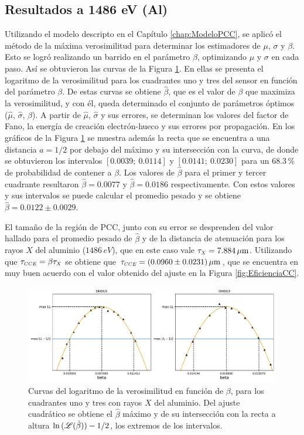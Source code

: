 \subsection{Resultados a 1486 eV (Al)}
\noindent Utilizando el modelo descripto en el Capítulo \ref{chap:ModeloPCC}, se aplicó el método de la máxima verosimilitud para determinar los estimadores de $\mu$, $\sigma$ y $\beta$. Esto se logró realizando un barrido en el parámetro $\beta$, optimizando $\mu$ y $\sigma$ en cada paso. Así se obtuvieron las curvas de la Figura \ref{fig:Al_barridos_beta}. En ellas se presenta el logaritmo de la verosimilitud para los cuadrantes uno y tres del sensor en función del parámetro $\beta$. De estas curvas se obtiene $\hat{\beta}$, que es el valor de $\beta$ que maximiza la verosimilitud, y con él, queda determinado el conjunto de parámetros óptimos ($\hat{\mu}$, $\hat{\sigma}$, $\hat{\beta}$). A partir de $\hat{\mu}$, $\hat{\sigma}$ y sus errores, se determinan los valores del factor de Fano, la energía de creación electrón-hueco y sus errores por propagación. En los gráficos de la Figura \ref{fig:Al_barridos_beta} se muestra además la recta que se encuentra a una distancia $a=1/2$ por debajo del máximo y su intersección con la curva, de donde se obtuvieron los intervalos $[0.0039;\ 0.0114]$ y $[0.0141;\ 0.0230]$ para un $68.3\,\%$ de probabilidad de contener a $\beta$. Los valores de $\hat{\beta}$ para el primer y tercer cuadrante resultaron $\hat{\beta} = 0.0077$ y $\hat{\beta}=0.0186$ respectivamente. Con estos valores y sus intervalos se puede calcular el promedio pesado y se obtiene $\hat{\beta} = 0.0122 \pm 0.0029 $.

El tamaño de la región de PCC, junto con su error se desprenden del valor hallado para el promedio pesado de $\hat{\beta}$ y de la distancia de atenuación para los rayos $X$ del aluminio ($1486\,\si{eV}$), que en este caso vale $\tau_{\scaleto{X}{4pt}}=7.884\,\si{\mu m}$\cite{AttenuationLength}. Utilizando que $\tau_{\scaleto{CCE}{4pt}} = \beta \tau_{\scaleto{X}{4pt}}$ se obtiene que $\tau_{\scaleto{CCE}{4pt}}=(0.0960\pm0.0231)\,\si{\mu m} $, que se encuentra en muy buen acuerdo con el valor obtenido del ajuste en la Figura \ref{fig:EficienciaCC}\cite{PCC-CCE-interno}.
\begin{figure}[h]
    \centering
        \includegraphics[scale=0.5]{Figs/Al_barridos_beta.pdf}
    \caption{Curvas del logaritmo de la verosimilitud en función de $\beta$, para los cuadrantes uno y tres con rayos $X$ del aluminio. Del ajuste cuadrático se obtiene el $\hat{\beta}$ máximo y de su intersección con la recta a altura $\ln{(\mathscr{L}(\hat{\beta}))} - 1/2$, los extremos de los intervalos.}
    \label{fig:Al_barridos_beta}
\end{figure}

